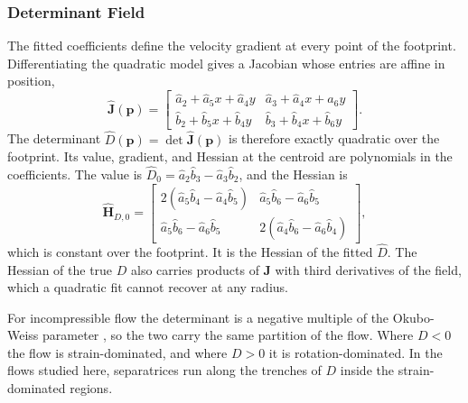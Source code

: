 \documentclass[lettersize,journal]{IEEEtran}
\begin{document}
\subsubsection{Determinant Field}
The fitted coefficients define the velocity gradient at every point of
the footprint. Differentiating the quadratic model gives a Jacobian whose
entries are affine in position,
\begin{equation}
    \hat{\mathbf{J}}(\mathbf{p}) =
    \begin{bmatrix}
        \hat{a}_2 + \hat{a}_5 x + \hat{a}_4 y &
        \hat{a}_3 + \hat{a}_4 x + \hat{a}_6 y \\
        \hat{b}_2 + \hat{b}_5 x + \hat{b}_4 y &
        \hat{b}_3 + \hat{b}_4 x + \hat{b}_6 y
    \end{bmatrix}.
    \label{eq:Jhat}
\end{equation}
The determinant $\hat{D}(\mathbf{p}) = \det\hat{\mathbf{J}}(\mathbf{p})$
is therefore exactly quadratic over the footprint. Its value, gradient,
and Hessian at the centroid are polynomials in the coefficients. The
value is $\hat{D}_0 = \hat{a}_2\hat{b}_3 - \hat{a}_3\hat{b}_2$, and the
Hessian is
\begin{equation}
    \hat{\mathbf{H}}_{D,0} =
    \begin{bmatrix}
        2(\hat{a}_5\hat{b}_4 - \hat{a}_4\hat{b}_5) &
        \hat{a}_5\hat{b}_6 - \hat{a}_6\hat{b}_5 \\
        \hat{a}_5\hat{b}_6 - \hat{a}_6\hat{b}_5 &
        2(\hat{a}_4\hat{b}_6 - \hat{a}_6\hat{b}_4)
    \end{bmatrix},
    \label{eq:hess_det}
\end{equation}
which is constant over the footprint. It is the Hessian of the fitted
$\hat{D}$. The Hessian of the true $D$ also carries products of
$\mathbf{J}$ with third derivatives of the field, which a quadratic fit
cannot recover at any radius.

For incompressible flow the determinant is a negative multiple of the
Okubo-Weiss parameter \cite{8,22}, so the two carry the same partition of
the flow. Where $D < 0$ the flow is strain-dominated, and where $D > 0$
it is rotation-dominated. In the flows studied here, separatrices run along the trenches of $D$
inside the strain-dominated regions.
\end{document}
